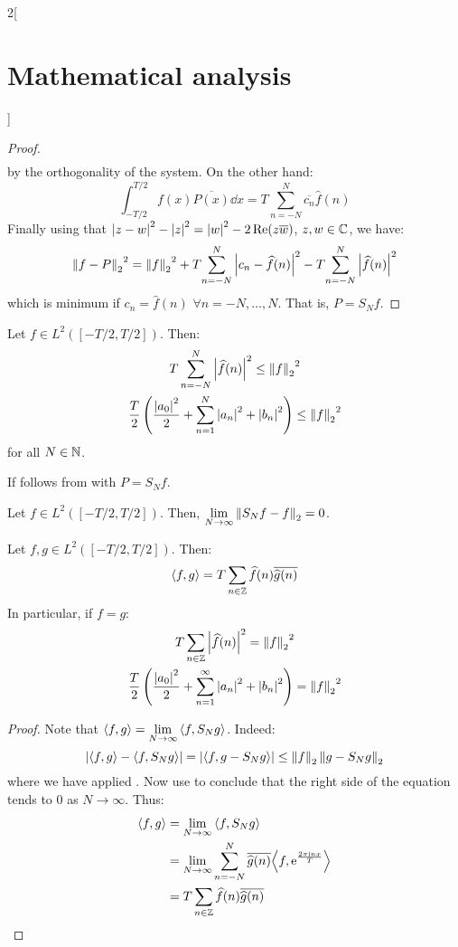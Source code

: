\documentclass[../../../main_math.tex]{subfiles}
\begin{document}
\begin{multicols}{2}[\section{Mathematical analysis}]
\begin{proof}
\begin{align*}
    \end{align*} by the orthogonality of the system.
    On the other hand:
    $$\int_{-T/2}^{T/2}f(x)\overline{P(x)}\dd{x}=T\sum_{n=-N}^N\overline{c_n}\widehat{f}(n)$$
    Finally using that $\abs{z-w}^2 -\abs{z}^2=\abs{w}^2-2\Re(z\overline{w})$, $z,w\in\mathbb{C}$, we have:
    \begin{equation}\label{MA:minimumL2}
      {\left\|f-P\right\|_2}^2={\left\|f\right\|_2}^2+T\!\sum_{n=-N}^{N}\abs{c_n-\widehat{f}(n)}^2-T\!\sum_{n=-N}^{N}\abs{\widehat{f}(n)}^2
    \end{equation}
    which is minimum if $c_n=\widehat{f}(n)$ $\forall n=-N,\ldots,N$. That is, $P=S_Nf$.
  \end{proof}
  \begin{corollary}\label{MA:bessel}
    Let $f\in L^2([-T/2,T/2])$. Then:
    \begin{gather*}
      T\sum_{n=-N}^N\abs{\widehat{f}(n)}^2\leq{\left\|f\right\|_2}^2\\
      \frac{T}{2}\left(\frac{\abs{a_0}^2}{2}+\sum_{n=1}^N\abs{a_n}^2+\abs{b_n}^2\right)\leq {\left\|f\right\|_2}^2
    \end{gather*} for all $N\in\mathbb{N} $.
  \end{corollary}
  \begin{sproof}
    If follows from  with $P=S_Nf$.
  \end{sproof}
  \begin{corollary}\label{MA:corollaryPolyAprox}
    Let $f\in L^2([-T/2,T/2])$. Then, $\displaystyle\lim_{N\to\infty}\left\|S_Nf-f\right\|_2=0$.
  \end{corollary}
  \begin{theorem}\label{MA:parseval}
    Let $f,g\in L^2([-T/2,T/2])$. Then: $$\langle f,g\rangle=T\sum_{n\in\mathbb{Z} }\widehat{f}(n)\overline{\widehat{g}(n)}$$
    In particular, if $f=g$:
    \begin{gather*}
      T\sum_{n\in\mathbb{Z}}\abs{\widehat{f}(n)}^2={\left\|f\right\|_2}^2\\
      \frac{T}{2}\left(\frac{\abs{a_0}^2}{2}+\sum_{n=1}^\infty\abs{a_n}^2+\abs{b_n}^2\right)= {\left\|f\right\|_2}^2
    \end{gather*}
  \end{theorem}
  \begin{proof}
    Note that $\displaystyle{\left\langle f,g\right\rangle}=\lim_{N\to\infty}{\left\langle f,S_Ng\right\rangle}$. Indeed:
    $$\abs{{\left\langle f,g\right\rangle}-{\left\langle f,S_Ng\right\rangle}}=\abs{{\left\langle f,g-S_Ng\right\rangle}}\leq \left\|f\right\|_2\left\|g-S_Ng\right\|_2$$
    where we have applied . Now use  to conclude that the right side of the equation tends to 0 as $N\to\infty$.
    Thus:
    \begin{align*}
      {\left\langle f,g\right\rangle} & =\lim_{N\to\infty}{\left\langle f,S_Ng\right\rangle}                                                              \\
                  & =\lim_{N\to\infty}\sum_{n=-N}^N\overline{\widehat{g}(n)}{\left\langle f,\mathrm{e}^{\frac{2\pi\mathrm{i} n x}{T}}\right\rangle} \\
                  & =T\sum_{n\in\mathbb{Z} }\widehat{f}(n)\overline{\widehat{g}(n)}
    \end{align*}
  \end{proof}

\end{multicols}
\end{document}
